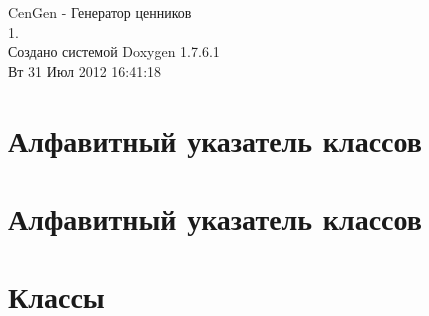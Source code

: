 \documentclass[a4paper]{book}
\begin{document}
\hypersetup{pageanchor=false,citecolor=blue}
\begin{titlepage}
\vspace*{7cm}
\begin{center}
{\Large \-Cen\-Gen -\/ Генератор ценников \\[1ex]\large 1. }\\
\vspace*{1cm}
{\large Создано системой Doxygen 1.7.6.1}\\
\vspace*{0.5cm}
{\small Вт 31 Июл 2012 16:41:18}\\
\end{center}
\end{titlepage}
\clearemptydoublepage
{}
\tableofcontents
\clearemptydoublepage
{}
\hypersetup{pageanchor=true,citecolor=blue}
\chapter{Алфавитный указатель классов}

\chapter{Алфавитный указатель классов}

\chapter{Классы}



























\printindex
\end{document}
